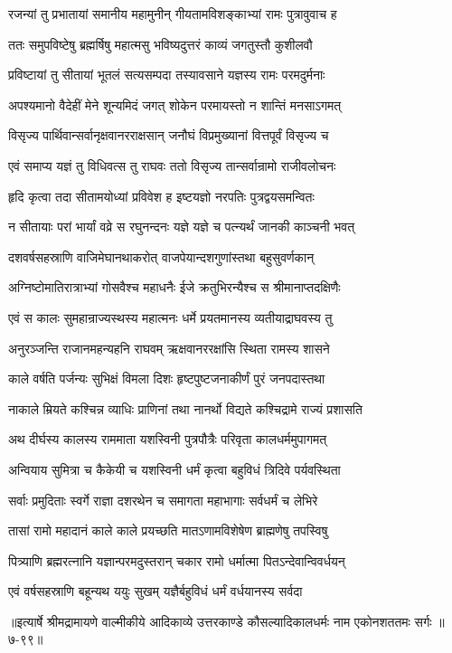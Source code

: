 
\twolineshloka
{रजन्यां तु प्रभातायां समानीय महामुनीन्}
{गीयतामविशङ्काभ्यां रामः पुत्रावुवाच ह} %

\twolineshloka
{ततः समुपविष्टेषु ब्रह्मर्षिषु महात्मसु}
{भविष्यदुत्तरं काव्यं जगतुस्तौ कुशीलवौ} %

\twolineshloka
{प्रविष्टायां तु सीतायां भूतलं सत्यसम्पदा}
{तस्यावसाने यज्ञस्य रामः परमदुर्मनाः} %

\twolineshloka
{अपश्यमानो वैदेहीं मेने शून्यमिदं जगत्}
{शोकेन परमायस्तो न शान्तिं मनसाऽगमत्} %

\twolineshloka
{विसृज्य पार्थिवान्सर्वानृक्षवानरराक्षसान्}
{जनौघं विप्रमुख्यानां वित्तपूर्वं विसृज्य च} %

\twolineshloka
{एवं समाप्य यज्ञं तु विधिवत्स तु राघवः}
{ततो विसृज्य तान्सर्वान्रामो राजीवलोचनः} %

\twolineshloka
{हृदि कृत्वा तदा सीतामयोध्यां प्रविवेश ह}
{इष्टयज्ञो नरपतिः पुत्रद्वयसमन्वितः} %

\twolineshloka
{न सीतायाः परां भार्यां वव्रे स रघुनन्दनः}
{यज्ञे यज्ञे च पत्न्यर्थं जानकी काञ्चनी भवत्} %

\twolineshloka
{दशवर्षसहस्राणि वाजिमेघानथाकरोत्}
{वाजपेयान्दशगुणांस्तथा बहुसुवर्णकान्} %

\twolineshloka
{अग्निष्टोमातिरात्राभ्यां गोसवैश्च महाधनैः}
{ईजे क्रतुभिरन्यैश्च स श्रीमानाप्तदक्षिणैः} %

\twolineshloka
{एवं स कालः सुमहान्राज्यस्थस्य महात्मनः}
{धर्मे प्रयतमानस्य व्यतीयाद्राघवस्य तु} %

\twolineshloka
{अनुरञ्जन्ति राजानमहन्यहनि राघवम्}
{ऋक्षवानररक्षांसि स्थिता रामस्य शासने} %

\twolineshloka
{काले वर्षति पर्जन्यः सुभिक्षं विमला दिशः}
{हृष्टपुष्टजनाकीर्णं पुरं जनपदास्तथा} %

\twolineshloka
{नाकाले म्रियते कश्चिन्न व्याधिः प्राणिनां तथा}
{नानर्थो विद्यते कश्चिद्रामे राज्यं प्रशासति} %

\twolineshloka
{अथ दीर्घस्य कालस्य राममाता यशस्विनी}
{पुत्रपौत्रैः परिवृता कालधर्ममुपागमत्} %

\twolineshloka
{अन्वियाय सुमित्रा च कैकेयी च यशस्विनी}
{धर्मं कृत्वा बहुविधं त्रिदिवे पर्यवस्थिता} %

\twolineshloka
{सर्वाः प्रमुदिताः स्वर्गे राज्ञा दशरथेन च}
{समागता महाभागाः सर्वधर्मं च लेभिरे} %

\twolineshloka
{तासां रामो महादानं काले काले प्रयच्छति}
{मातऽणामविशेषेण ब्राह्मणेषु तपस्विषु} %

\twolineshloka
{पित्र्याणि ब्रह्मरत्नानि यज्ञान्परमदुस्तरान्}
{चकार रामो धर्मात्मा पितऽन्देवान्विवर्धयन्} %

\twolineshloka
{एवं वर्षसहस्राणि बहून्यथ ययुः सुखम्}
{यज्ञैर्बहुविधं धर्मं वर्धयानस्य सर्वदा} %


॥इत्यार्षे श्रीमद्रामायणे वाल्मीकीये आदिकाव्ये उत्तरकाण्डे कौसल्यादिकालधर्मः नाम एकोनशततमः सर्गः ॥७-९९॥
